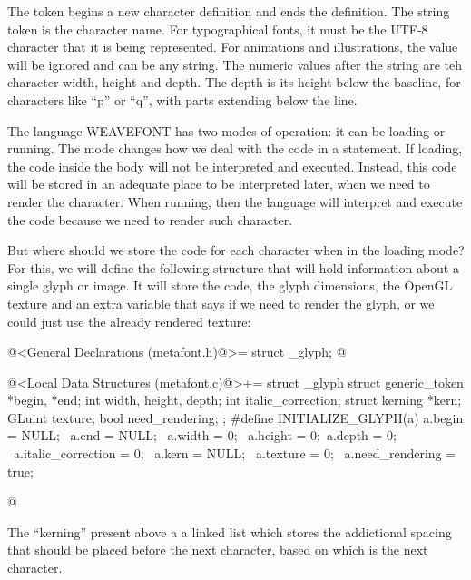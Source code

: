 {{{{{The token  begins a new character definition
and  ends the definition. The string token is the
character name. For typographical fonts, it must be the UTF-8
character that it is being represented. For animations and
illustrations, the value will be ignored and can be any string. The
numeric values after the string are teh character width, height and
depth. The depth is its height below the baseline, for characters like
``p'' or ``q'', with parts extending below the line.

The language WEAVEFONT has two modes of operation: it can be loading
or running. The mode changes how we deal with the code in
a  statement. If loading, the code inside
the  body will not be interpreted and
executed. Instead, this code will be stored in an adequate place to be
interpreted later, when we need to render the character. When running,
then the language will interpret and execute the code because we need
to render such character.


But where should we store the code for each character when in the
loading mode? For this, we will define the following structure that
will hold information about a single glyph or image. It will store the
code, the glyph dimensions, the OpenGL texture and an extra variable
that says if we need to render the glyph, or we could just use the
already rendered texture:

\iniciocodigo
@<General Declarations (metafont.h)@>=
struct _glyph;
@
\fimcodigo

\iniciocodigo
@<Local Data Structures (metafont.c)@>+=
struct _glyph{
  struct generic_token *begin, *end;
  int width, height, depth;
  int italic_correction;
  struct kerning *kern;
  GLuint texture;
  bool need_rendering;
};
#define INITIALIZE_GLYPH(a) {a.begin = NULL; \
                            a.end = NULL; \
                            a.width = 0; \
                            a.height = 0;\
                            a.depth = 0; \
                            a.italic_correction = 0; \
                            a.kern = NULL; \
                            a.texture = 0; \
                            a.need_rendering = true; \
                            }

@
\fimcodigo

The ``kerning'' present above a a linked list which stores the
addictional spacing that should be placed before the next character,
based on which is the next character.

}}}}}

